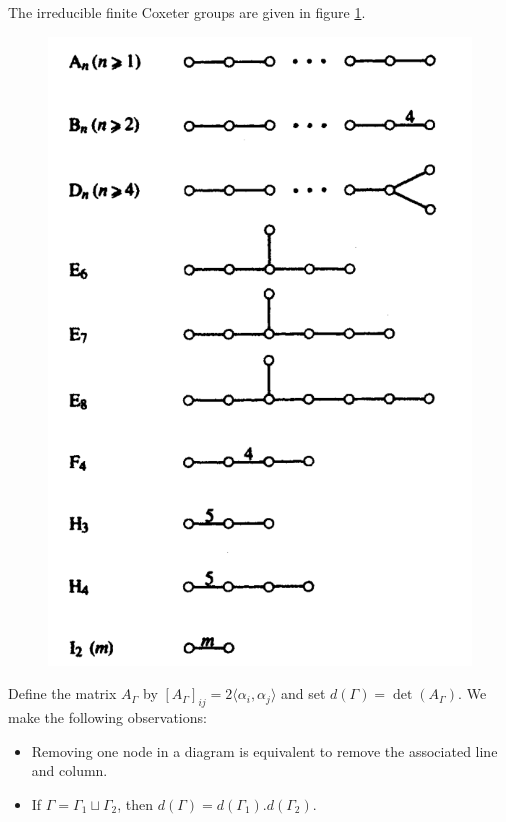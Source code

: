 \documentclass[envcountsame,envcountchap]{svmono}
\begin{document}
\begin{theorem}
The irreducible finite Coxeter groups are given in figure \ref{Classification}.
\begin{figure}[h!]
\centering
\includegraphics[scale=0.6]{Classification.png}
\label{Classification}
\caption{}
\end{figure}    
\label{classification thm}
\end{theorem}

\begin{remark}
Define the matrix $A_\Gamma$ by $[A_\Gamma]_{ij} = 2 \langle \alpha_i , \alpha_j \rangle$ and set $d(\Gamma) = \det (A_\Gamma ) $. We make the following observations:
\begin{itemize}
\item Removing one node in a diagram is equivalent to remove the associated line and column. 
\item If $\Gamma = \Gamma_1 \sqcup \Gamma_2$, then $d(\Gamma ) = d (\Gamma_1). d(\Gamma_2)$.
\end{itemize}
\end{remark}
\end{document}
